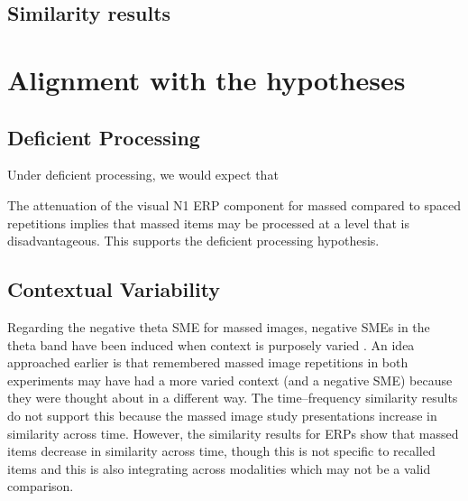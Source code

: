 \subsection{Similarity results}


\section{Alignment with the hypotheses}


\subsection{Deficient Processing}

Under deficient processing, we would expect that


The attenuation of the visual N1 ERP component for massed compared to spaced repetitions implies that massed items may be processed at a level that is disadvantageous.  This supports the deficient processing hypothesis.



\subsection{Contextual Variability}




Regarding the negative theta SME for massed images, negative SMEs in the theta band have been induced when context is purposely varied \cite{StauHans2013}.  An idea approached earlier is that remembered massed image repetitions in both experiments may have had a more varied context (and a negative SME) because they were thought about in a different way.  The time--frequency similarity results do not support this because the massed image study presentations increase in similarity across time.  However, the similarity results for ERPs show that massed items decrease in similarity across time, though this is not specific to recalled items and this is also integrating across modalities which may not be a valid comparison.

